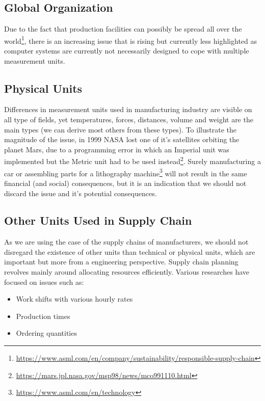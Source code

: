 \documentclass[sigchi, nonacm]{acmart}
\begin{document}
\subsection{Global Organization}
Due to the fact that production facilities can possibly be spread all over the world\footnote{\url{https://www.asml.com/en/company/sustainability/responsible-supply-chain}}, there is an increasing issue that is rising but currently less highlighted as computer systems are currently not necessarily designed to cope with multiple measurement units\cite{foster2013quantities}.

\subsection{Physical Units}
Differences in measurement units used in manufacturing industry are visible on all type of fields, yet temperatures, forces, distances, volume and weight are the main types (we can derive most others from these types). To illustrate the magnitude of the issue, in 1999 NASA lost one of it's satellites orbiting the planet Mars, due to a programming error in which an Imperial unit was implemented but the Metric unit had to be used instead\footnote{\url{https://mars.jpl.nasa.gov/msp98/news/mco991110.html}}\cite{NASA}. Surely manufacturing a car or assembling parts for a lithography machine\footnote{\url{https://www.asml.com/en/technology}} will not result in the same financial (and social) consequences, but it is an indication that we should not discard the issue and it's potential consequences.

\subsection{Other Units Used in Supply Chain}
As we are using the case of the supply chains of manufacturers, we should not disregard the existence of other units than technical or physical units, which are important but more from a engineering perspective. Supply chain planning revolves mainly around allocating resources efficiently. Various researches \cite{graves1998dynamic}\cite{sarkar2016supply} have focused on issues such as:

\begin{itemize}
    \item{Work shifts with various hourly rates}
    \item{Production times}
    \item{Ordering quantities}
\end{itemize}
\end{document}
